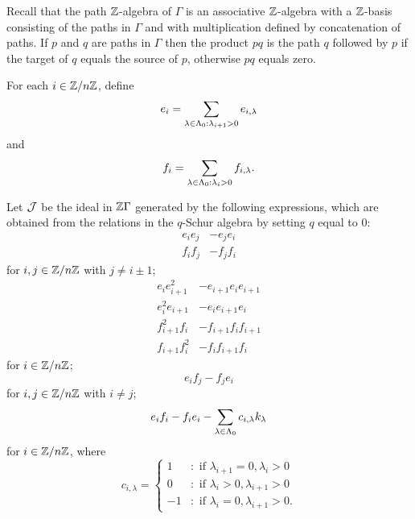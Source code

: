 \documentclass[a4paper, 11pt, twoside]{report}
\begin{document}
Recall that the path $\mathbb{Z}$-algebra of $\Gamma$ is an associative $\mathbb{Z}$-algebra with a $\mathbb{Z}$-basis consisting of the paths in $\Gamma$ and with multiplication defined by concatenation of paths. If $p$ and $q$ are paths in $\Gamma$ then the product $pq$ is the path $q$ followed by $p$ if the target of $q$ equals the source of $p$, otherwise $pq$ equals zero.

For each $i\in\mathbb{Z}/{n \mathbb{Z}}$, define
\begin{equation*}
e_i = \sum_{\lambda\in\Lambda_0{}:\lambda_{i+1}>0} e_{i,\lambda}
\end{equation*}
and
\begin{equation*}
f_i = \sum_{\lambda\in\Lambda_0{}:\lambda_i>0} f_{i,\lambda}.
\end{equation*}

Let $\mathcal{J}$ be the ideal in $\mathbb{Z}\Gamma$ generated by the following expressions, which are obtained from the relations in the $q$-Schur algebra by setting $q$ equal to $0$:
\begin{align*}
e_ie_j &- e_je_i\\
f_if_j &- f_jf_i
\end{align*}
for $i,j\in\mathbb{Z}/{n \mathbb{Z}}$ with $j\neq i\pm 1$;
\begin{align*}
e_i e_{i+1}^2 &- e_{i+1}e_ie_{i+1}\\
e_i^2e_{i+1} &- e_ie_{i+1}e_i\\
f_{i+1}^2f_i &- f_{i+1}f_i f_{i+1}\\
f_{i+1}f_i^2 &- f_i f_{i+1} f_i
\end{align*}
for $i\in\mathbb{Z}/{n \mathbb{Z}}$;
\begin{equation*}
e_if_j -f_je_i
\end{equation*}
for $i,j\in\mathbb{Z}/{n \mathbb{Z}}$ with $i\neq j$;
\begin{equation*}
e_if_i - f_ie_i -\sum_{\lambda\in\Lambda_0{}}c_{i,\lambda}k_\lambda
\end{equation*}
for $i\in\mathbb{Z}/{n \mathbb{Z}}$, where
\begin{equation*}
c_{i,\lambda} = \begin{cases}
1 &:\text{ if } \lambda_{i+1}=0,\lambda_i>0\\
0 &:\text{ if } \lambda_i>0, \lambda_{i+1}>0\\
-1 &:\text{ if } \lambda_i=0, \lambda_{i+1}>0.
\end{cases}
\end{equation*}
\end{document}
